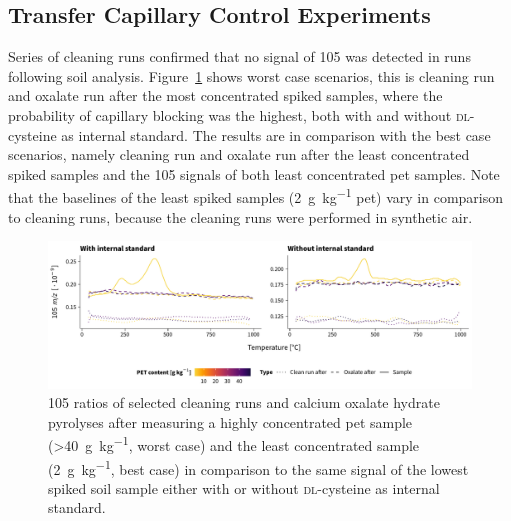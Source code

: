 \subsection{Transfer Capillary Control Experiments}

Series of cleaning runs confirmed that no signal of \SI{105}{\mz} was detected in runs following soil analysis. Figure~\ref{fig:tga-capillary-checks} shows worst case scenarios, this is cleaning run and oxalate run after the most concentrated spiked samples, where the probability of capillary blocking was the highest, both with and without \textsc{dl}-cysteine as internal standard.
The results are in comparison with the best case scenarios, namely cleaning run and oxalate run after the least concentrated spiked samples and the \SI{105}{\mz} signals of both least concentrated \ac{pet} samples.
Note that the baselines of the least spiked samples (\SI{2}{\gram\per\kilo\gram} \ac{pet}) vary in comparison to cleaning runs, because the cleaning runs were performed in synthetic air.

\begin{figure}
	\includegraphics[width=\textwidth]{figures/tga-capillary-checks}
	\caption[\SI{105}{\mz} ratios of selected cleaning runs and calcium oxalate hydrate pyrolyses after measuring a highly concentrated \ac{pet} sample and the least concentrated sample with or without internal standard.]{\SI{105}{\mz} ratios of selected cleaning runs and calcium oxalate hydrate pyrolyses after measuring a highly concentrated \ac{pet} sample (\SI{>40}{\gram\per\kilo\gram}, worst case) and the least concentrated sample (\SI{2}{\gram\per\kilo\gram}, best case) in comparison to the same signal of the lowest spiked soil sample either with or without \textsc{dl}-cysteine as internal standard.}
	\label{fig:tga-capillary-checks}
	\forcerectofloat
\end{figure}

